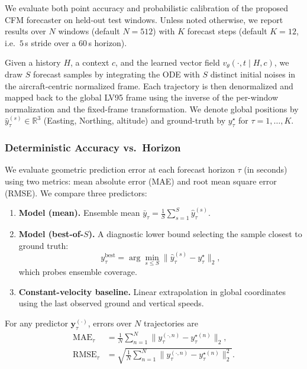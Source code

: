 \documentclass[
  manuscript=proceedings,  %
  layout=preprint,  %
  year=20xx,
  volume=x,
]{extra/joas}
\begin{document}
We evaluate both point accuracy and probabilistic calibration of the proposed CFM forecaster on held-out test windows. Unless noted otherwise, we report results over $N$ windows (default $N{=}512$) with $K$ forecast steps (default $K{=}12$, i.e.\ $5$\,s stride over a $60$\,s horizon).


Given a history $H$, a context $c$, and the learned vector field $v_\theta(\cdot,t\mid H,c)$, we draw $S$ forecast samples by integrating the ODE with $S$ distinct initial noises in the aircraft-centric normalized frame. Each trajectory is then denormalized and mapped back to the global LV95 frame using the inverse of the per-window normalization and the fixed-frame transformation. We denote global positions by $\hat{y}^{(s)}_{\tau}\in\mathbb{R}^3$ (Easting, Northing, altitude) and ground-truth by $y^{\star}_{\tau}$ for $\tau{=}1,\dots,K$.

\subsubsection{Deterministic Accuracy vs.\ Horizon}
\label{subsubsec:mae_rmse}

We evaluate geometric prediction error at each forecast horizon $\tau$ (in seconds) using two metrics: mean absolute error (MAE) and root mean square error (RMSE). We compare three predictors:

\begin{enumerate}
  \item \textbf{Model (mean).} Ensemble mean $\bar{y}_\tau = \frac{1}{S}\sum_{s=1}^S \hat{y}_\tau^{(s)}$.
  \item \textbf{Model (best-of-$S$).} A diagnostic lower bound selecting the sample closest to ground truth:
  \[
  y^{\text{best}}_\tau = \arg\min_{s \le S} \bigl\lVert \hat{y}^{(s)}_\tau - y^\star_\tau \bigr\rVert_2,
  \]
  which probes ensemble coverage.
  \item \textbf{Constant-velocity baseline.} Linear extrapolation in global coordinates using the last observed ground and vertical speeds.
\end{enumerate}

For any predictor $\mathbf{y}^{(\cdot)}_\tau$, errors over $N$ trajectories are
\begin{align}
\mathrm{MAE}_\tau 
&= \frac{1}{N}\sum_{n=1}^N 
\bigl\lVert y^{(\cdot,n)}_{\tau} - y^{\star(n)}_{\tau} \bigr\rVert_2,
\label{eq:mae}\\[4pt]
\mathrm{RMSE}_\tau 
&= \sqrt{\frac{1}{N}\sum_{n=1}^N 
\bigl\lVert y^{(\cdot,n)}_{\tau} - y^{\star(n)}_{\tau} \bigr\rVert_2^2 }.
\label{eq:rmse}
\end{align}
\end{document}
